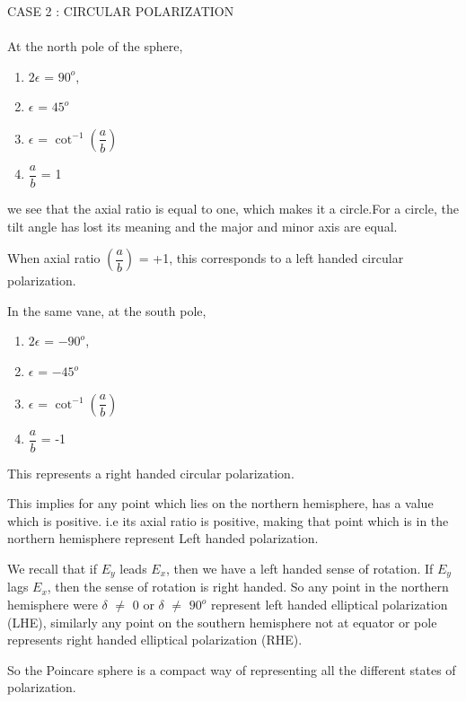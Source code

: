 	CASE 2 : CIRCULAR POLARIZATION\\\\
	At the north pole of the sphere,
	\begin{enumerate}
	 	\item 	$2\epsilon$ = $90^{o}$, 
		\item	$\epsilon$ = $45^{o}$\\
		\item	$\epsilon$ = $\cot^{-1}(\dfrac{a}{b})$\\
		\item	$\dfrac{a}{b}$ = 1
	\end{enumerate}
	we see that the axial ratio is equal to one, which makes it a circle.For a circle, the tilt angle has lost its meaning and the major and minor axis are equal.
	
	When axial ratio $(\dfrac{a}{b})$ = +1, this corresponds to a left handed circular polarization.
	
	In the same vane, at the south pole,
	\begin{enumerate}
		\item	$2\epsilon$ = $-90^{o}$, 
		\item $\epsilon$ = $-45^{o}$\\
		\item $\epsilon$ = $\cot^{-1}(\dfrac{a}{b})$\\
		\item $\dfrac{a}{b}$ = -1
	\end{enumerate}	
	This represents a right handed circular polarization.
	
	This implies for any point which lies on the northern hemisphere, has a value which is positive. i.e its axial ratio is positive, making that point which is in the northern hemisphere represent Left handed polarization.
	
	We recall that if $E_{y}$ leads $E_{x}$, then we have a left handed sense of rotation. If $E_{y}$ lags $E_{x}$, then the sense of rotation is right handed. So any point in the northern hemisphere were $\delta$ $\neq$ 0 or $\delta$ $\neq$ $90^{o}$ represent left handed elliptical polarization  (LHE), similarly any point on the southern hemisphere not at equator or pole represents right handed elliptical polarization (RHE).
	
	So the Poincare sphere is a compact way of representing all the different states of polarization.
